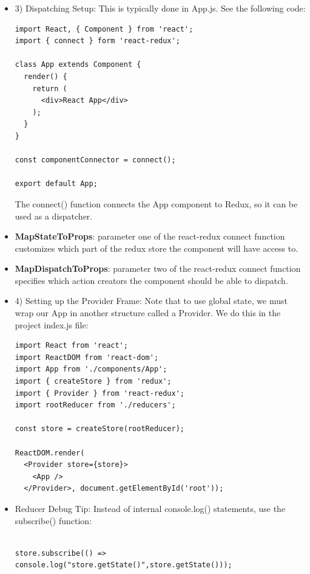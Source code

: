 \documentclass[8pt,a4paper]{extarticle}
\begin{document}
\begin{itemize}
\begin{verbatim}
\end{verbatim}

\item 3) Dispatching Setup: This is typically done in App.js. See the following code:

\begin{verbatim}
import React, { Component } from 'react';
import { connect } form 'react-redux';

class App extends Component {
  render() {
    return (
      <div>React App</div>
    );
  }
}

const componentConnector = connect();

export default App;
\end{verbatim}

The connect() function connects the App component to Redux, so it can be used as a dispatcher.

\item \textbf{MapStateToProps}: parameter one of the react-redux connect function customizes which part of the redux store the component will have access to.

\item \textbf{MapDispatchToProps}: parameter two of the react-redux connect function specifies which action creators the component should be able to dispatch.


\item 4) Setting up the Provider Frame: Note that to use global state, we must wrap our App in another structure called a Provider. We do this in the project index.js file:

\begin{verbatim}
import React from 'react';
import ReactDOM from 'react-dom';
import App from './components/App';
import { createStore } from 'redux';
import { Provider } from 'react-redux'; 
import rootReducer from './reducers';

const store = createStore(rootReducer);

ReactDOM.render(
  <Provider store={store}>
    <App />
  </Provider>, document.getElementById('root'));

\end{verbatim}


\item Reducer Debug Tip: Instead of internal console.log() statements, use the subscribe() function:

\begin{verbatim}

store.subscribe(() => console.log("store.getState()",store.getState()));


\end{verbatim}
\end{itemize}
\end{document}
